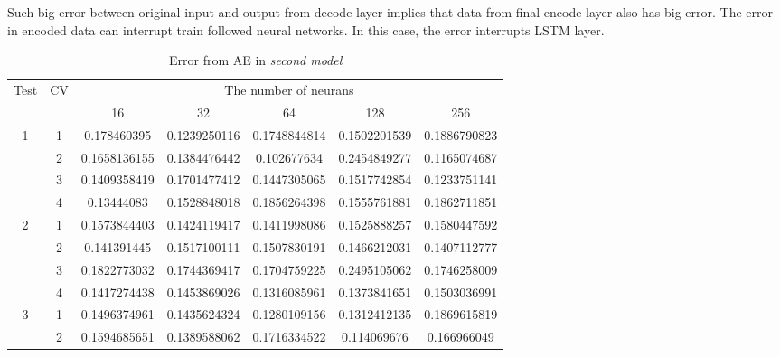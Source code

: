 \documentclass[draft,dvipsnames]{drexel-thesis}
\begin{document}
\begin{thesis}
Such big error between original input and output from decode layer implies that data from final encode layer also has big error. The error in encoded data can interrupt train followed neural networks. In this case, the error interrupts LSTM layer.


\begin{table}[!t]
\centering
\caption{Error from AE in {\em second model}}
\label{tbl:sae_error}
\begin{tabular}{|c|c|c|c|c|c|c|}
\hline

\multirow{2}{*}{Test} & \multirow{2}{*}{CV} & \multicolumn{5}{c|}{The number of neurans}                                   \\ \cline{3-7}
                      &                     & 16            & 32            & 64            & 128           & 256          \\ \hline
\multirow{4}{*}{1}    & 1                   & 0.178460395   & 0.1239250116  & 0.1748844814  & 0.1502201539  & 0.1886790823 \\ \cline{2-7}
                      & 2                   & 0.1658136155  & 0.1384476442  & 0.102677634   & 0.2454849277  & 0.1165074687 \\ \cline{2-7}
                      & 3                   & 0.1409358419  & 0.1701477412  & 0.1447305065  & 0.1517742854  & 0.1233751141 \\ \cline{2-7}
                      & 4                   & 0.13444083    & 0.1528848018  & 0.1856264398  & 0.1555761881  & 0.1862711851 \\ \hline
\multirow{4}{*}{2}    & 1                   & 0.1573844403  & 0.1424119417  & 0.1411998086  & 0.1525888257  & 0.1580447592 \\ \cline{2-7}
                      & 2                   & 0.141391445   & 0.1517100111  & 0.1507830191  & 0.1466212031  & 0.1407112777 \\ \cline{2-7}
                      & 3                   & 0.1822773032  & 0.1744369417  & 0.1704759225  & 0.2495105062  & 0.1746258009 \\ \cline{2-7}
                      & 4                   & 0.1417274438  & 0.1453869026  & 0.1316085961  & 0.1373841651  & 0.1503036991 \\ \hline
\multirow{4}{*}{3}    & 1                   & 0.1496374961  & 0.1435624324  & 0.1280109156  & 0.1312412135  & 0.1869615819 \\ \cline{2-7}
                      & 2                   & 0.1594685651  & 0.1389588062  & 0.1716334522  & 0.114069676   & 0.166966049  \\ \cline{2-7}

\end{tabular}
\end{table}
\end{thesis}
\end{document}
